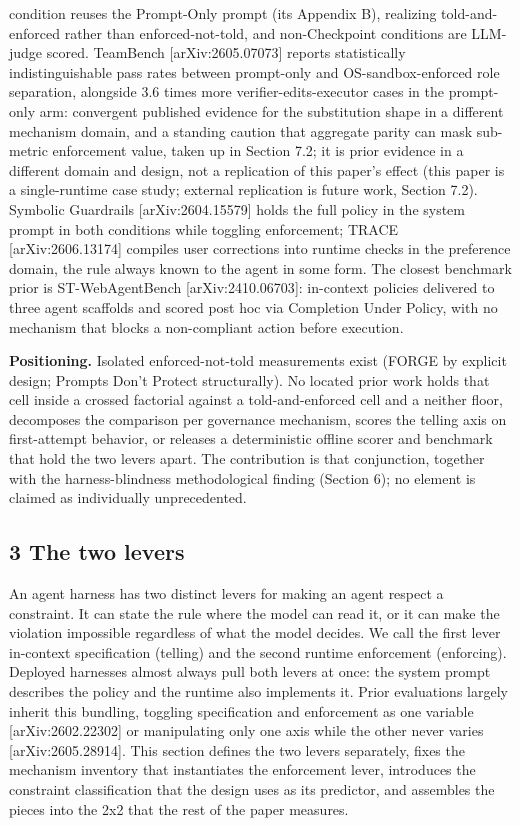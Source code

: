 \documentclass[
]{article}
\begin{document}
condition reuses the Prompt-Only prompt (its Appendix B), realizing
told-and-enforced rather than enforced-not-told, and non-Checkpoint
conditions are LLM-judge scored. TeamBench {[}arXiv:2605.07073{]}
reports statistically indistinguishable pass rates between prompt-only
and OS-sandbox-enforced role separation, alongside 3.6 times more
verifier-edits-executor cases in the prompt-only arm: convergent
published evidence for the substitution shape in a different mechanism
domain, and a standing caution that aggregate parity can mask sub-metric
enforcement value, taken up in Section 7.2; it is prior evidence in a
different domain and design, not a replication of this paper's effect
(this paper is a single-runtime case study; external replication is
future work, Section 7.2). Symbolic Guardrails {[}arXiv:2604.15579{]}
holds the full policy in the system prompt in both conditions while
toggling enforcement; TRACE {[}arXiv:2606.13174{]} compiles user
corrections into runtime checks in the preference domain, the rule
always known to the agent in some form. The closest benchmark prior is
ST-WebAgentBench {[}arXiv:2410.06703{]}: in-context policies delivered
to three agent scaffolds and scored post hoc via Completion Under
Policy, with no mechanism that blocks a non-compliant action before
execution.

\textbf{Positioning.} Isolated enforced-not-told measurements exist
(FORGE by explicit design; Prompts Don't Protect structurally). No
located prior work holds that cell inside a crossed factorial against a
told-and-enforced cell and a neither floor, decomposes the comparison
per governance mechanism, scores the telling axis on first-attempt
behavior, or releases a deterministic offline scorer and benchmark that
hold the two levers apart. The contribution is that conjunction,
together with the harness-blindness methodological finding (Section 6);
no element is claimed as individually unprecedented.

\subsection{3 The two levers}\label{the-two-levers}

An agent harness has two distinct levers for making an agent respect a
constraint. It can state the rule where the model can read it, or it can
make the violation impossible regardless of what the model decides. We
call the first lever in-context specification (telling) and the second
runtime enforcement (enforcing). Deployed harnesses almost always pull
both levers at once: the system prompt describes the policy and the
runtime also implements it. Prior evaluations largely inherit this
bundling, toggling specification and enforcement as one variable
{[}arXiv:2602.22302{]} or manipulating only one axis while the other
never varies {[}arXiv:2605.28914{]}. This section defines the two levers
separately, fixes the mechanism inventory that instantiates the
enforcement lever, introduces the constraint classification that the
design uses as its predictor, and assembles the pieces into the 2x2 that
the rest of the paper measures.
\end{document}
